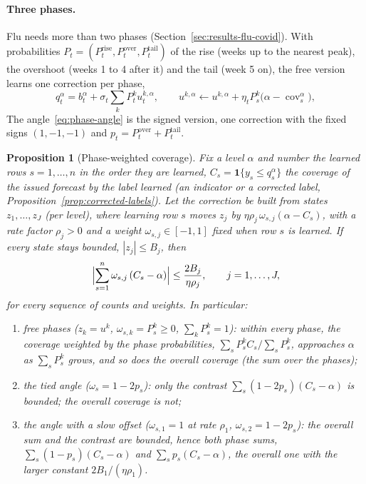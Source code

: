 \documentclass[11pt,a4paper]{article}
\newcommand{\ind}{\mathbf{1}}
\DeclareMathOperator{\cov}{cov}
\newtheorem{proposition}{Proposition}[section]
\theoremstyle{definition}
\theoremstyle{remark}
\begin{document}
\paragraph{Three phases.} Flu needs more than two phases
(Section~\ref{sec:results-flu-covid}). With probabilities
$P_t=(P_t^{\mathrm{rise}},P_t^{\mathrm{over}},P_t^{\mathrm{tail}})$ of the
rise (weeks up to the nearest peak), the overshoot (weeks 1 to 4 after it)
and the tail (week 5 on), the free version learns one correction per phase,
\begin{equation}
 q_t^\alpha=b_t^\alpha+\sigma_t\sum_{k}P_t^k u_t^{k,\alpha},\qquad
 u^{k,\alpha}\leftarrow u^{k,\alpha}+\eta_tP_s^k\bigl(\alpha-\cov_s^\alpha\bigr),
 \label{eq:three-phase}
\end{equation}
The angle~\eqref{eq:phase-angle} is the signed version, one correction with
the fixed signs $(1,-1,-1)$ and $p_t=P_t^{\mathrm{over}}+P_t^{\mathrm{tail}}$.

\begin{proposition}[Phase-weighted coverage]
\label{prop:phase-weighted}
Fix a level $\alpha$ and number the learned rows $s=1,\dots,n$ in the
order they are learned, $C_s=\ind\{y_s\le q_s^\alpha\}$ the coverage of
the issued forecast by the label learned (an indicator or a corrected
label, Proposition~\ref{prop:corrected-labels}). Let the correction be
built from states $z_1,\dots,z_J$ (per level), where learning row $s$
moves $z_j$ by $\eta\rho_j\,\omega_{s,j}(\alpha-C_s)$, with a rate factor
$\rho_j>0$ and a weight $\omega_{s,j}\in[-1,1]$ fixed when row $s$ is
learned. If every state stays bounded, $|z_j|\le B_j$, then
\begin{equation}
 \Bigl|\sum_{s=1}^n\omega_{s,j}\,(C_s-\alpha)\Bigr|\le\frac{2B_j}{\eta\rho_j},
 \qquad j=1,\dots,J,
 \label{eq:phase-weighted}
\end{equation}
for every sequence of counts and weights. In particular:
\begin{enumerate}[label=(\alph*),leftmargin=*,itemsep=2pt]
\item free phases ($z_k=u^k$, $\omega_{s,k}=P_s^k\ge0$,
$\sum_kP_s^k=1$): within every phase, the coverage weighted by the phase
probabilities, $\sum_sP_s^kC_s/\sum_sP_s^k$, approaches $\alpha$ as
$\sum_sP_s^k$ grows, and so does the overall coverage (the sum over the
phases);
\item the tied angle ($\omega_s=1-2p_s$): only the contrast
$\sum_s(1-2p_s)(C_s-\alpha)$ is bounded; the overall coverage is not;
\item the angle with a slow offset ($\omega_{s,1}=1$ at rate $\rho_1$,
$\omega_{s,2}=1-2p_s$): the overall sum and the contrast are bounded, hence
both phase sums,
$\sum_s(1-p_s)(C_s-\alpha)$ and $\sum_sp_s(C_s-\alpha)$, the overall one
with the larger constant $2B_1/(\eta\rho_1)$.
\end{enumerate}
\end{proposition}
\end{document}
